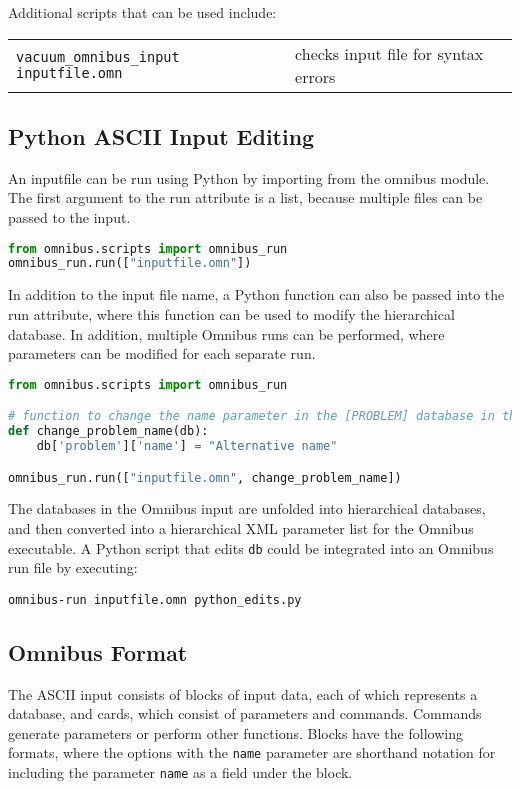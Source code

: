\documentclass[10pt]{article}
\begin{document}
Additional scripts that can be used include:\newline

\begin{tabular}{l l}
\texttt{vacuum\_omnibus\_input inputfile.omn} & checks input file for syntax errors\\
\end{tabular}\newline

\subsection{Python ASCII Input Editing}
An inputfile can be run using Python by importing from the omnibus module. The first argument to the run attribute is a list, because multiple files can be passed to the input.  

\begin{lstlisting}[language=Python]
from omnibus.scripts import omnibus_run
omnibus_run.run(["inputfile.omn"])
\end{lstlisting}

In addition to the input file name, a Python function can also be passed into the run attribute, where this function can be used to modify the hierarchical database. In addition, multiple Omnibus runs can be performed, where parameters can be modified for each separate run.

\begin{lstlisting}[language=Python]
from omnibus.scripts import omnibus_run

# function to change the name parameter in the [PROBLEM] database in the Omnibus input
def change_problem_name(db):
	db['problem']['name'] = "Alternative name"

omnibus_run.run(["inputfile.omn", change_problem_name])
\end{lstlisting}

The databases in the Omnibus input are unfolded into hierarchical databases, and then converted into a hierarchical XML parameter list for the Omnibus executable. A Python script that edits \texttt{db} could be integrated into an Omnibus run file by executing:\newline

\texttt{omnibus-run inputfile.omn python\_edits.py}\newline

\subsection{Omnibus Format}
The ASCII input consists of blocks of input data, each of which represents a database, and cards, which consist of parameters and commands. Commands generate parameters or perform other functions. Blocks have the following formats, where the options with the \texttt{name} parameter are shorthand notation for including the parameter \texttt{name} as a field under the block.\newline
\end{document}

